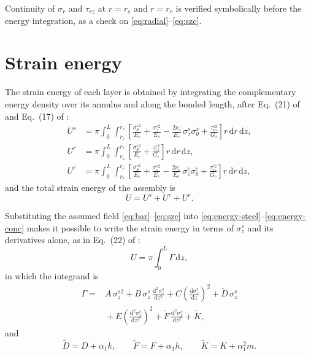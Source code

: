 Continuity of $\sigma_r$ and $\tau_{rz}$ at $r = r_s$ and $r = r_r$ is
verified symbolically before the energy integration, as a check on
\eqref{eq:radial}--\eqref{eq:szc}.

\section{Strain energy}
\label{sec:energy}
 
The strain energy of each layer is obtained by integrating the complementary
energy density over its annulus and along the bonded length, after Eq.~(21) of
\textcite{nemesModelingCylindricalAdhesively2009} and Eq.~(17) of
\textcite{alaviAnalyticalProcedureFailure2025}:
\begin{align}
\label{eq:energy-steel}
U^{s} &= \pi \int_0^L \!\! \int_{r_i}^{r_s}
  \left[ \frac{\sigma_\theta^{s2}}{E_s}
       + \frac{\sigma_z^{s2}}{E_s}
       - \frac{2\nu_s}{E_s}\,\sigma_z^{s}\sigma_\theta^{s}
       + \frac{\tau_{rz}^{s2}}{G_s} \right] r\,\mathrm{d}r\,\mathrm{d}z , \\[8pt]
\label{eq:energy-rib}
U^{r} &= \pi \int_0^L \!\! \int_{r_s}^{r_r}
  \left[ \frac{\sigma_\theta^{r2}}{E_r}
       + \frac{\tau_{rz}^{r2}}{G_r} \right] r\,\mathrm{d}r\,\mathrm{d}z , \\[8pt]
\label{eq:energy-conc}
U^{c} &= \pi \int_0^L \!\! \int_{r_r}^{r_e}
  \left[ \frac{\sigma_\theta^{c2}}{E_c}
       + \frac{\sigma_z^{c2}}{E_c}
       - \frac{2\nu_c}{E_c}\,\sigma_z^{c}\sigma_\theta^{c}
       + \frac{\tau_{rz}^{c2}}{G_c} \right] r\,\mathrm{d}r\,\mathrm{d}z ,
\end{align}
and the total strain energy of the assembly is
\begin{equation}
\label{eq:energy}
U = U^{s} + U^{r} + U^{c} .
\end{equation}
 
Substituting the assumed field \eqref{eq:bar}--\eqref{eq:szc} into
\eqref{eq:energy-steel}--\eqref{eq:energy-conc} makes it possible to write the
strain energy in terms of $\sigma_z^{s}$ and its derivatives alone, as in
Eq.~(22) of \textcite{nemesModelingCylindricalAdhesively2009}:
\begin{equation}
\label{eq:quadform}
U = \pi \int_0^L \Gamma \,\mathrm{d}z ,
\end{equation}
in which the integrand is
\begin{equation}
\label{eq:gamma}
\begin{split}
\Gamma = {}& A\,\sigma_z^{s2}
   + B\,\sigma_z^{s}\,\frac{\mathrm{d}^2\sigma_z^{s}}{\mathrm{d}z^2}
   + C\left(\frac{\mathrm{d}\sigma_z^{s}}{\mathrm{d}z}\right)^{\!2}
   + \tilde{D}\,\sigma_z^{s} \\[8pt]
 &{} + E\left(\frac{\mathrm{d}^2\sigma_z^{s}}{\mathrm{d}z^2}\right)^{\!2}
   + \tilde{F}\,\frac{\mathrm{d}^2\sigma_z^{s}}{\mathrm{d}z^2}
   + \tilde{K} ,
\end{split}
\end{equation}
and
\begin{equation}
\label{eq:coeffs}
\tilde{D} = D + \alpha_1 k, \qquad
\tilde{F} = F + \alpha_1 h, \qquad
\tilde{K} = K + \alpha_1^2 m .
\end{equation}
 

